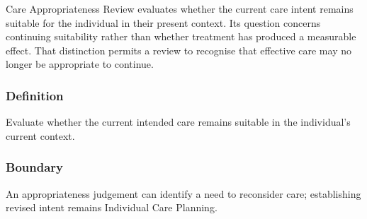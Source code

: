 Care Appropriateness Review evaluates whether the current care intent remains suitable for the individual in their present context. Its question concerns continuing suitability rather than whether treatment has produced a measurable effect. That distinction permits a review to recognise that effective care may no longer be appropriate to continue.

\subsubsection*{Definition}

Evaluate whether the current intended care remains suitable in the individual’s current context.

\subsubsection*{Boundary}

An appropriateness judgement can identify a need to reconsider care; establishing revised intent remains Individual Care Planning.

